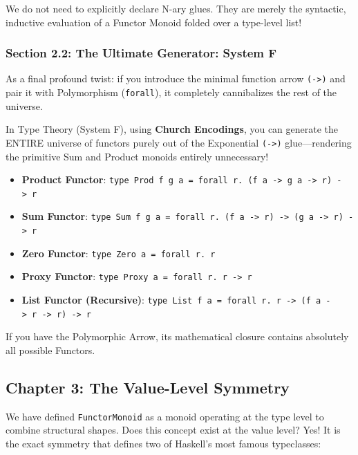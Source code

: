 \documentclass[
]{article}
\providecommand{\tightlist}{%
  \setlength{\itemsep}{0pt}\setlength{\parskip}{0pt}}
\begin{document}
We do not need to explicitly declare N-ary glues. They are merely the
syntactic, inductive evaluation of a Functor Monoid folded over a
type-level list!

\subsubsection{Section 2.2: The Ultimate Generator: System
F}\label{section-2.2-the-ultimate-generator-system-f}

As a final profound twist: if you introduce the minimal function arrow
\texttt{(-\textgreater{})} and pair it with Polymorphism
(\texttt{forall}), it completely cannibalizes the rest of the universe.

In Type Theory (System F), using \textbf{Church Encodings}, you can
generate the ENTIRE universe of functors purely out of the Exponential
\texttt{(-\textgreater{})} glue---rendering the primitive Sum and
Product monoids entirely unnecessary!

\begin{itemize}
\tightlist
\item
  \textbf{Product Functor}:
  \texttt{type\ Prod\ f\ g\ a\ =\ forall\ r.\ (f\ a\ -\textgreater{}\ g\ a\ -\textgreater{}\ r)\ -\textgreater{}\ r}
\item
  \textbf{Sum Functor}:
  \texttt{type\ Sum\ f\ g\ a\ =\ forall\ r.\ (f\ a\ -\textgreater{}\ r)\ -\textgreater{}\ (g\ a\ -\textgreater{}\ r)\ -\textgreater{}\ r}
\item
  \textbf{Zero Functor}: \texttt{type\ Zero\ a\ =\ forall\ r.\ r}
\item
  \textbf{Proxy Functor}:
  \texttt{type\ Proxy\ a\ =\ forall\ r.\ r\ -\textgreater{}\ r}
\item
  \textbf{List Functor (Recursive)}:
  \texttt{type\ List\ f\ a\ =\ forall\ r.\ r\ -\textgreater{}\ (f\ a\ -\textgreater{}\ r\ -\textgreater{}\ r)\ -\textgreater{}\ r}
\end{itemize}

If you have the Polymorphic Arrow, its mathematical closure contains
absolutely all possible Functors.

\subsection{Chapter 3: The Value-Level
Symmetry}\label{chapter-3-the-value-level-symmetry}

We have defined \texttt{FunctorMonoid} as a monoid operating at the type
level to combine structural shapes. Does this concept exist at the value
level? Yes! It is the exact symmetry that defines two of Haskell's most
famous typeclasses:
\end{document}
